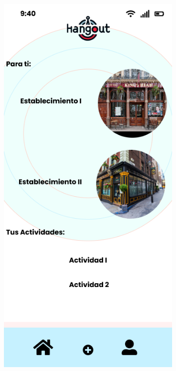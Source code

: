 \clearpage
\vspace*{\fill}
\begin{figure}[H]
    \centering
    \begin{subfigure}{0.45\textwidth}
        \centering
        \includegraphics[width=\linewidth]{imagenes/mockup5.png}

\end{subfigure}
\end{figure}
